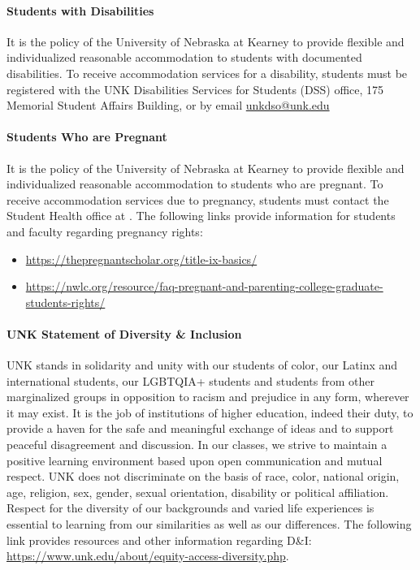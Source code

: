 \documentclass[12pt]{article}
\newcounter{ex}\setcounter{ex}{0}
\begin{document}
\paragraph{Students with Disabilities} It is the policy of the University of Nebraska 
at Kearney to provide flexible and individualized reasonable accommodation 
to students with documented disabilities. To receive accommodation services 
for a disability, students must be registered with the UNK Disabilities Services 
for Students (DSS) office, 175 Memorial Student Affairs Building, 
 or by email 
\href{mailto:unkdso@unk.edu}{unkdso@unk.edu}  


\paragraph{Students Who are Pregnant} It is the policy of the University of Nebraska at Kearney to provide flexible and 
individualized reasonable accommodation to students who are pregnant. To receive 
accommodation services due to pregnancy, students must contact the 
Student Health office at . The following links provide information 
for students and faculty regarding pregnancy rights: 

\begin{itemize}
\setlength\itemsep{-0.25em}
\item \url{https://thepregnantscholar.org/title-ix-basics/} 

\item \url{https://nwlc.org/resource/faq-pregnant-and-parenting-college-graduate-students-rights/}

\end{itemize}

\paragraph{UNK Statement of Diversity \& Inclusion}

UNK stands in solidarity and unity with our students of color, our Latinx 
and international students, our LGBTQIA+ students and students from other 
marginalized groups in opposition to racism and prejudice in any form, 
wherever it may exist. It is the job of institutions of higher education, 
indeed their duty, to provide a haven for the safe and meaningful exchange of 
ideas and to support peaceful disagreement and discussion. In our classes, 
we strive to maintain a positive learning environment based upon open 
communication and mutual respect. UNK does not discriminate on the basis of 
race, color, national origin, age, religion, sex, gender, sexual orientation, 
disability or political affiliation. Respect for the diversity of our backgrounds 
and varied life experiences is essential to learning from our similarities as 
well as our differences. The following link provides resources and other 
information regarding D\&I: \url{https://www.unk.edu/about/equity-access-diversity.php}.
\end{document}
